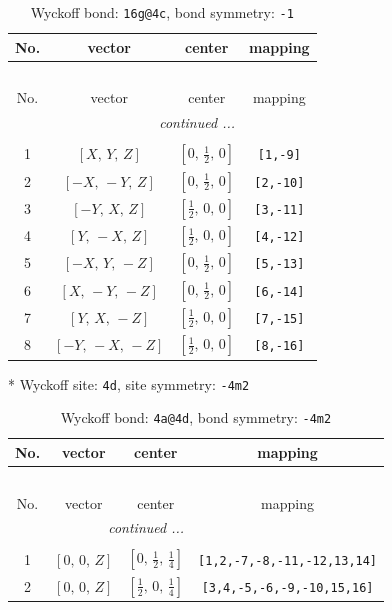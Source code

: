 \documentclass[fleqn,8pt]{jsarticle}
\begin{document}
\begin{longtable}{cccc}
\caption{Wyckoff bond: {\tt 16g@4c}, bond symmetry: {\tt -1}}
 \\
 \hline \hline
No. & vector & center & mapping \\ \hline \endfirsthead

\multicolumn{3}{l}{\tablename\ \thetable{}} \\
 \hline \hline
No. & vector & center & mapping \\ \hline \endhead

 \hline \hline
\multicolumn{3}{r}{\footnotesize\it continued ...} \\ \endfoot

 \hline \hline
\multicolumn{3}{r}{} \\ \endlastfoot

1 & $\left[ X,\, Y,\, Z \right]$ & $\left[ 0,\, \frac{1}{2},\, 0 \right]$ & {\tt [1,-9]} \\ \hline
2 & $\left[ - X,\, - Y,\, Z \right]$ & $\left[ 0,\, \frac{1}{2},\, 0 \right]$ & {\tt [2,-10]} \\ \hline
3 & $\left[ - Y,\, X,\, Z \right]$ & $\left[ \frac{1}{2},\, 0,\, 0 \right]$ & {\tt [3,-11]} \\ \hline
4 & $\left[ Y,\, - X,\, Z \right]$ & $\left[ \frac{1}{2},\, 0,\, 0 \right]$ & {\tt [4,-12]} \\ \hline
5 & $\left[ - X,\, Y,\, - Z \right]$ & $\left[ 0,\, \frac{1}{2},\, 0 \right]$ & {\tt [5,-13]} \\ \hline
6 & $\left[ X,\, - Y,\, - Z \right]$ & $\left[ 0,\, \frac{1}{2},\, 0 \right]$ & {\tt [6,-14]} \\ \hline
7 & $\left[ Y,\, X,\, - Z \right]$ & $\left[ \frac{1}{2},\, 0,\, 0 \right]$ & {\tt [7,-15]} \\ \hline
8 & $\left[ - Y,\, - X,\, - Z \right]$ & $\left[ \frac{1}{2},\, 0,\, 0 \right]$ & {\tt [8,-16]} \\
\end{longtable}
* Wyckoff site: {\tt 4d}, site symmetry: {\tt -4m2}
\renewcommand{\arraystretch}{1.2}
\begin{longtable}{cccc}
\caption{Wyckoff bond: {\tt 4a@4d}, bond symmetry: {\tt -4m2}}
 \\
 \hline \hline
No. & vector & center & mapping \\ \hline \endfirsthead

\multicolumn{3}{l}{\tablename\ \thetable{}} \\
 \hline \hline
No. & vector & center & mapping \\ \hline \endhead

 \hline \hline
\multicolumn{3}{r}{\footnotesize\it continued ...} \\ \endfoot

 \hline \hline
\multicolumn{3}{r}{} \\ \endlastfoot

1 & $\left[ 0,\, 0,\, Z \right]$ & $\left[ 0,\, \frac{1}{2},\, \frac{1}{4} \right]$ & {\tt [1,2,-7,-8,-11,-12,13,14]} \\ \hline
2 & $\left[ 0,\, 0,\, Z \right]$ & $\left[ \frac{1}{2},\, 0,\, \frac{1}{4} \right]$ & {\tt [3,4,-5,-6,-9,-10,15,16]} \\
\end{longtable}
\end{document}
